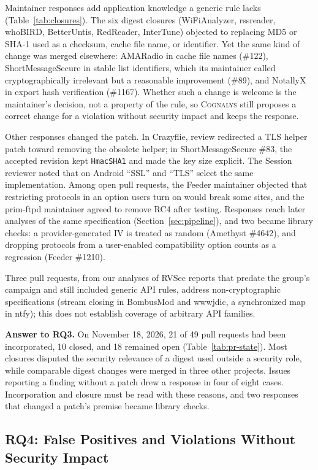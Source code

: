 \documentclass[conference]{IEEEtran}
\newcommand{\system}{\textsc{Cognalys}}
\newcommand{\researchq}[1]{\textbf{RQ#1}}
\begin{document}
Maintainer responses add application knowledge a generic rule lacks
(Table~\ref{tab:closures}). The six digest closures (WiFiAnalyzer, rssreader,
whoBIRD, BetterUntis, RedReader, InterTune) objected to replacing MD5 or SHA-1
used as a checksum, cache file name, or identifier. Yet the same kind of
change was merged elsewhere: AMARadio in cache file names (\#122),
ShortMessageSecure in stable list identifiers, which its maintainer called
cryptographically irrelevant but a reasonable improvement (\#89), and NotallyX
in export hash verification (\#1167). Whether such a change is welcome is the
maintainer's decision, not a property of the rule, so {\system} still proposes
a correct change for a violation without security impact and keeps the
response.

Other responses changed the patch. In Crazyflie, review redirected a TLS
helper patch toward removing the obsolete helper; in ShortMessageSecure \#83,
the accepted revision kept \texttt{HmacSHA1} and made the key size explicit.
The Session reviewer noted that on Android ``SSL'' and ``TLS'' select the same
implementation. Among open pull requests, the Feeder maintainer objected
that restricting protocols in an option users turn on would break some sites,
and the prim-ftpd maintainer agreed to remove RC4 after testing. Responses
reach later analyses of the same specification (Section~\ref{sec:pipeline}),
and two became library checks: a provider-generated IV is treated as random
(Amethyst \#4642), and dropping protocols from a user-enabled compatibility
option counts as a regression (Feeder \#1210).

Three pull requests, from our analyses of RVSec reports that predate the
group's campaign and still included generic API rules, address non-cryptographic specifications (stream closing in BombusMod
and wwwjdic, a synchronized map in ntfy); this does not establish coverage of
arbitrary API families.

\textbf{Answer to \researchq{3}.} On November 18, 2026, 21 of 49 pull
requests had been incorporated, 10 closed, and 18 remained open
(Table~\ref{tab:pr-state}). Most closures disputed the security relevance of a
digest used outside a security role, while comparable digest changes were
merged in three other projects. Issues reporting a finding without a patch
drew a response in four of eight cases. Incorporation and closure must be read
with these reasons, and two responses that changed a patch's premise became
library checks.

\subsection{\researchq{4}: False Positives and Violations Without Security Impact}
\end{document}
